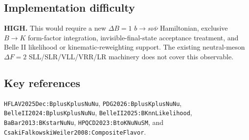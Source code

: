 \subsection*{Implementation difficulty}
\textbf{HIGH.}  This would require a new \(\Delta B=1\) \(b\to s\nu\bar{\nu}\)
Hamiltonian, exclusive \(B\to K\) form-factor integration, invisible-final-state
acceptance treatment, and Belle II likelihood or kinematic-reweighting support.
The existing neutral-meson \(\Delta F=2\) SLL/SLR/VLL/VRR/LR machinery does not
cover this observable.

\subsection*{Key references}
\texttt{HFLAV2025Dec:BplusKplusNuNu}, \texttt{PDG2026:BplusKplusNuNu},
\texttt{BelleII2024:BplusKplusNuNu}, \texttt{BelleII2025:BKnnLikelihood},
\texttt{BaBar2013:BKstarNuNu}, \texttt{HPQCD2023:BtoKNuNuSM}, and
\texttt{CsakiFalkowskiWeiler2008:CompositeFlavor}.
